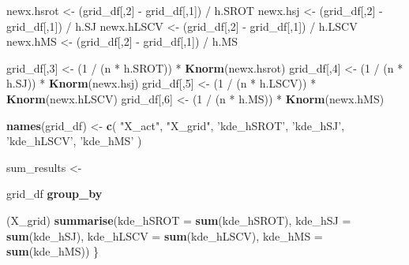 \documentclass[]{article}
\newenvironment{Shaded}{\begin{snugshade}}{\end{snugshade}}
\newcommand{\KeywordTok}[1]{\textcolor[rgb]{0.13,0.29,0.53}{\textbf{{#1}}}}
\newcommand{\DataTypeTok}[1]{\textcolor[rgb]{0.13,0.29,0.53}{{#1}}}
\newcommand{\DecValTok}[1]{\textcolor[rgb]{0.00,0.00,0.81}{{#1}}}
\newcommand{\StringTok}[1]{\textcolor[rgb]{0.31,0.60,0.02}{{#1}}}
\newcommand{\NormalTok}[1]{{#1}}
\begin{document}
\begin{Shaded}
\begin{Highlighting}[]
        
        
        \NormalTok{newx.hsrot <-}\StringTok{ }\NormalTok{(grid_df[,}\DecValTok{2}\NormalTok{] -}\StringTok{ }\NormalTok{grid_df[,}\DecValTok{1}\NormalTok{]) /}\StringTok{ }\NormalTok{h.SROT}
        \NormalTok{newx.hsj <-}\StringTok{ }\NormalTok{(grid_df[,}\DecValTok{2}\NormalTok{] -}\StringTok{ }\NormalTok{grid_df[,}\DecValTok{1}\NormalTok{]) /}\StringTok{ }\NormalTok{h.SJ}
        \NormalTok{newx.hLSCV <-}\StringTok{ }\NormalTok{(grid_df[,}\DecValTok{2}\NormalTok{] -}\StringTok{ }\NormalTok{grid_df[,}\DecValTok{1}\NormalTok{]) /}\StringTok{ }\NormalTok{h.LSCV}
        \NormalTok{newx.hMS <-}\StringTok{ }\NormalTok{(grid_df[,}\DecValTok{2}\NormalTok{] -}\StringTok{ }\NormalTok{grid_df[,}\DecValTok{1}\NormalTok{]) /}\StringTok{ }\NormalTok{h.MS}
        
        \NormalTok{grid_df[,}\DecValTok{3}\NormalTok{] <-}\StringTok{ }\NormalTok{(}\DecValTok{1} \NormalTok{/}\StringTok{ }\NormalTok{(n *}\StringTok{ }\NormalTok{h.SROT)) *}\StringTok{ }\KeywordTok{Knorm}\NormalTok{(newx.hsrot)}
        \NormalTok{grid_df[,}\DecValTok{4}\NormalTok{] <-}\StringTok{ }\NormalTok{(}\DecValTok{1} \NormalTok{/}\StringTok{ }\NormalTok{(n *}\StringTok{ }\NormalTok{h.SJ)) *}\StringTok{ }\KeywordTok{Knorm}\NormalTok{(newx.hsj)}
        \NormalTok{grid_df[,}\DecValTok{5}\NormalTok{] <-}\StringTok{ }\NormalTok{(}\DecValTok{1} \NormalTok{/}\StringTok{ }\NormalTok{(n *}\StringTok{ }\NormalTok{h.LSCV)) *}\StringTok{ }\KeywordTok{Knorm}\NormalTok{(newx.hLSCV)}
        \NormalTok{grid_df[,}\DecValTok{6}\NormalTok{] <-}\StringTok{ }\NormalTok{(}\DecValTok{1} \NormalTok{/}\StringTok{ }\NormalTok{(n *}\StringTok{ }\NormalTok{h.MS)) *}\StringTok{ }\KeywordTok{Knorm}\NormalTok{(newx.hMS)}
        
        
        \KeywordTok{names}\NormalTok{(grid_df) <-}\StringTok{ }\KeywordTok{c}\NormalTok{(}
            \StringTok{"X_act"}\NormalTok{, }
            \StringTok{"X_grid"}\NormalTok{, }
            \StringTok{'kde_hSROT'}\NormalTok{,}
            \StringTok{'kde_hSJ'}\NormalTok{,}
            \StringTok{'kde_hLSCV'}\NormalTok{,}
            \StringTok{'kde_hMS'}
        \NormalTok{)}
        
        
        \NormalTok{sum_results <-}\StringTok{ }
\StringTok{            }\NormalTok{grid_df %
\StringTok{            }\KeywordTok{group_by}\NormalTok{(X_grid) %
\StringTok{            }\KeywordTok{summarise}\NormalTok{(}\DataTypeTok{kde_hSROT =} \KeywordTok{sum}\NormalTok{(kde_hSROT),}
                      \DataTypeTok{kde_hSJ =} \KeywordTok{sum}\NormalTok{(kde_hSJ),}
                      \DataTypeTok{kde_hLSCV =} \KeywordTok{sum}\NormalTok{(kde_hLSCV),}
                      \DataTypeTok{kde_hMS =} \KeywordTok{sum}\NormalTok{(kde_hMS))}
    \NormalTok{\}}
    
}}
\end{Highlighting}
\end{Shaded}
\end{document}
